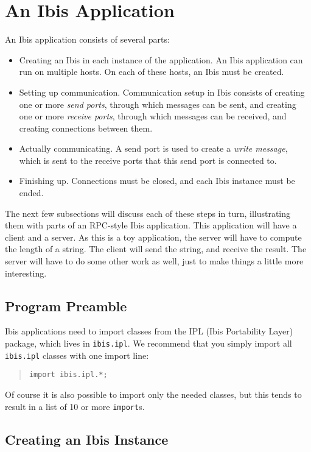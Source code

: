 \documentclass[10pt]{article}
\newcommand{\mysection}[1]{\section{#1}\label{#1}}
\newcommand{\mysubsection}[1]{\subsection{#1}\label{#1}}
\begin{document}
\mysection{An Ibis Application}

An Ibis application consists of several parts:
\begin{itemize}
\item
Creating an Ibis in each instance of the application.
An Ibis application can run on multiple hosts.
On each of these hosts, an Ibis must be created.
\item
Setting up communication. Communication setup in Ibis
consists of creating one or more \emph{send ports}, through which messages
can be sent, and creating one or more \emph{receive ports},
through which messages can be received, and creating connections between them.
\item
Actually communicating. A send port is used to create a 
\emph{write message}, which is sent to the receive ports that this send port
is connected to.
\item
Finishing up. Connections must be closed, and each Ibis instance must
be ended.
\end{itemize}
\noindent
The next few subsections will discuss each of these steps in turn,
illustrating them with parts of an RPC-style Ibis application.
This application will have a client and a server. As this is a toy
application, the server will have to compute the length of a string.
The client will send the string, and receive the result.
The server will have to do some other work as well, just to make
things a little more interesting.

\subsection{Program Preamble}

Ibis applications need to import classes from the IPL (Ibis
Portability Layer) package, which lives in
\verb+ibis.ipl+.
We recommend that you simply import all \texttt{ibis.ipl} classes with
one import line:
\begin{quote}
\begin{verbatim}
import ibis.ipl.*;
\end{verbatim}
\end{quote}
Of course it is also possible to import only the needed classes, but
this tends to result in a list of 10 or more \verb+import+s.

\mysubsection{Creating an Ibis Instance}
\end{document}
